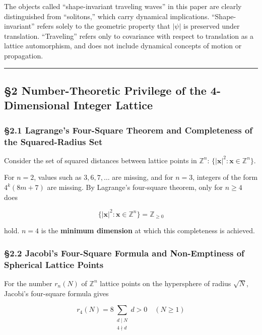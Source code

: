 \documentclass[
  a4paper,11pt]{article}
\theoremstyle{definition}
\theoremstyle{remark}
\begin{document}
The objects called ``shape-invariant traveling waves'' in this paper are
clearly distinguished from ``solitons,'' which carry dynamical
implications. ``Shape-invariant'' refers solely to the geometric
property that \(|\psi|\) is preserved under translation. ``Traveling''
refers only to covariance with respect to translation as a lattice
automorphism, and does not include dynamical concepts of motion or
propagation.

\begin{center}\rule{0.5\linewidth}{0.5pt}\end{center}

\subsection{§2 Number-Theoretic Privilege of the 4-Dimensional Integer
Lattice}\label{number-theoretic-privilege-of-the-4-dimensional-integer-lattice}

\subsubsection{§2.1 Lagrange's Four-Square Theorem and Completeness of
the Squared-Radius
Set}\label{lagranges-four-square-theorem-and-completeness-of-the-squared-radius-set}

Consider the set of squared distances between lattice points in
\(\mathbb{Z}^n\): \(\{|\mathbf{x}|^2 : \mathbf{x} \in \mathbb{Z}^n\}\).

For \(n = 2\), values such as \(3, 6, 7, \ldots\) are missing, and for
\(n = 3\), integers of the form \(4^k(8m+7)\) are missing. By Lagrange's
four-square theorem, only for \(n \geq 4\) does

\[\{|\mathbf{x}|^2 : \mathbf{x} \in \mathbb{Z}^n\} = \mathbb{Z}_{\geq 0}\]

hold. \(n = 4\) is the \textbf{minimum dimension} at which this
completeness is achieved.

\subsubsection{§2.2 Jacobi's Four-Square Formula and Non-Emptiness of
Spherical Lattice
Points}\label{jacobis-four-square-formula-and-non-emptiness-of-spherical-lattice-points}

For the number \(r_n(N)\) of \(\mathbb{Z}^n\) lattice points on the
hypersphere of radius \(\sqrt{N}\), Jacobi's four-square formula gives

\[r_4(N) = 8 \sum_{\substack{d \mid N \\ 4 \nmid d}} d > 0 \quad (N \geq 1)\]
\end{document}
